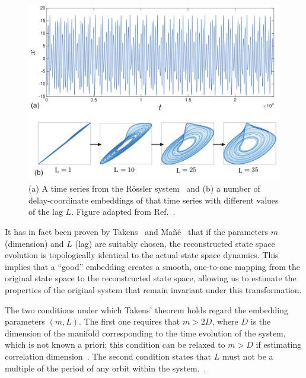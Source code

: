 \begin{figure}[!htbp]
    \centering
    \includegraphics[width=\linewidth]{images/rossler_embedding.png}
    \caption{
    (a) A time series from the R{\"o}ssler system~\cite{rossler1977continuous}
    and (b) a number of delay-coordinate embeddings of that time series with different values of the lag $L$.
    Figure adapted from Ref.~\cite{ref:bradley2015nonlinear}.}\label{fig: rossler embedding}
\end{figure}

It has in fact been proven by Takens~\cite{ref:takens2006detecting} and Ma{\~n}{\'e}~\cite{ref:mane2006dimension} that
if the parameters $m$ (dimension) and $L$ (lag) are suitably chosen,
the reconstructed state space evolution is topologically identical to the actual state space dynamics.
This implies that a ``good'' embedding creates a smooth, one-to-one mapping from the original state space to the reconstructed state space, allowing us to estimate the properties of the original system that remain invariant under this transformation.


The two conditions under which Takens' theorem holds regard the embedding parameters $(m,L)$.
The first one requires that $m>2D$, where $D$ is the dimension of the manifold corresponding to the
time evolution of the system, which is not known a priori; this condition can be relaxed to $m>D$ if
estimating correlation dimension~\cite{ref:ding1993estimating}.
The second condition states that $L$ must not be a multiple of the period of any orbit within the system.~\cite{ref:grassberger1991nonlinear}.


